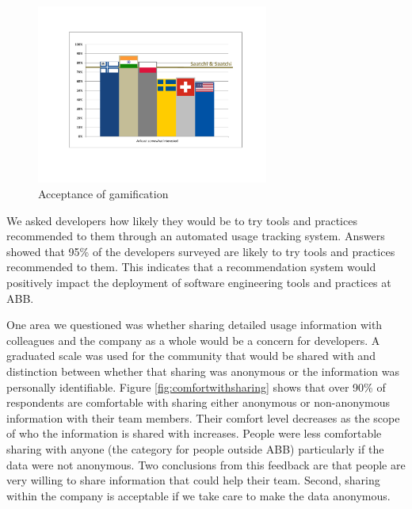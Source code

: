 \documentclass{sig-alternate}
\begin{document}
\begin{figure}\begin{mdframed}[linecolor=white]
	\includegraphics[width=3in]{gamificationquestion.pdf}
	\caption{Acceptance of gamification}
	\label{fig:gamification}
\end{mdframed}\end{figure}

We asked developers how likely they would be to try tools and practices recommended to them through an automated usage tracking system.  Answers showed that 95\% of the developers surveyed are likely to try tools and practices recommended to them.  This indicates that a recommendation system would positively impact the deployment of software engineering tools and practices at ABB.

One area we questioned was whether sharing detailed usage information with colleagues and the company as a whole would be a concern for developers.  A graduated scale was used for the community that would be shared with and distinction between whether that sharing was anonymous or the information was personally identifiable. Figure \ref{fig:comfortwithsharing}  shows that over 90\% of respondents are comfortable with sharing either anonymous or non-anonymous information with their team members. 
Their comfort level decreases as the scope of who the information is shared with increases.  People were less comfortable sharing with anyone (the category for people outside ABB) particularly if the data were not anonymous.  
Two conclusions from this feedback are that people are very willing to share information that could help their team. Second, sharing within the company is acceptable if we take care to make the data anonymous.
\end{document}
